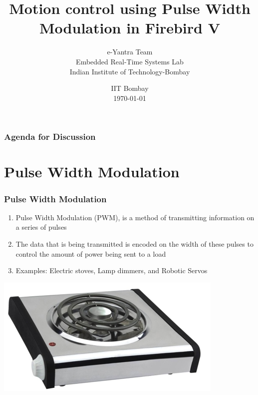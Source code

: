 \documentclass[table,10pt,red]{beamer}	%
\title
[
	Firebird-V Robotics Research Platform	%
	\hspace{0.5cm}
	\insertframenumber/\inserttotalframenumber
]
{
	Motion control using Pulse Width Modulation in Firebird V
}
\author
[
	www.e-yantra.org 	%
]
{
	e-Yantra Team \\
  Embedded Real-Time Systems Lab\\
  Indian Institute of Technology-Bombay \\
}
\date
{
IIT Bombay \\ {\today}	%
}
\begin{document}

\begin{frame}	%
	\titlepage %
\end{frame}

\begin{frame}
	\frametitle{Agenda for Discussion} %
	\tableofcontents 
\end{frame}


\section{Pulse Width Modulation} 


\begin{frame}

\frametitle{Pulse Width Modulation} \pause

\begin{enumerate}

\item<+-|alert@+> Pulse Width Modulation (PWM), is a method of transmitting information on a series of pulses \\[10pt]

\item<+-|alert@+> The data that is being transmitted is encoded on the width of these pulses to control the amount of power being sent to a load \\[10pt]

\item<+-|alert@+> Examples: Electric stoves, Lamp dimmers, and Robotic Servos \\[10pt]

\end{enumerate} \pause

\includegraphics[width = 0.5\linewidth]{electric_stove} 

\end{frame}
\end{document}
